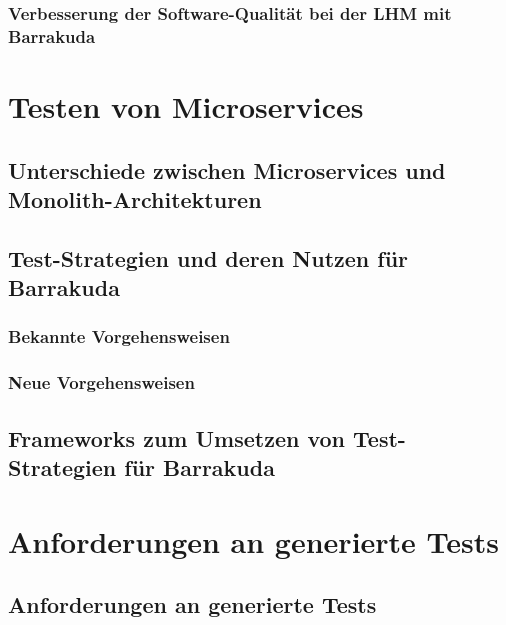 \documentclass[12pt,a4paper,bibliography=totocnumbered,listof=totocnumbered]{scrartcl}
\begin{document}
\subsubsection{Verbesserung der Software-Qualität bei der LHM mit Barrakuda}


\section{Testen von Microservices}

\subsection{Unterschiede zwischen Microservices und Monolith-Architekturen}

\subsection{Test-Strategien und deren Nutzen für Barrakuda}

\subsubsection{Bekannte Vorgehensweisen}

\subsubsection{Neue Vorgehensweisen}

\subsection{Frameworks zum Umsetzen von Test-Strategien für Barrakuda}

\section{Anforderungen an generierte Tests}

\subsection{Anforderungen an generierte Tests}
\end{document}
